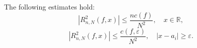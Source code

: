\begin{lemma} 
	The following estimates hold:
	\begin{equation} 
	\left|R_{n,N}^{2}(f,x)\right|\leq\frac{nc(f)}{N^2},\quad x\in\mathbb{R},\label{eq:Lemma3_firsteq}
	\end{equation}
	\begin{equation} 
	\left|R_{n,N}^{2}(f,x)\right|\leq\frac{c(f,\varepsilon)}{N^{2}},\quad\left|x-a_{i}\right|\geq\varepsilon.\label{eq:Lemma3_secondeq}
	\end{equation}
\end{lemma}




